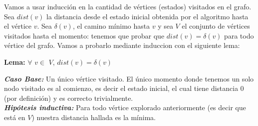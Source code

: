 Vamos a usar inducción en la cantidad de vértices (estados) visitados en el grafo.
Sea $dist(v)$ la distancia desde el estado inicial obtenida por el algoritmo hasta el vértice $v$. Sea $\delta(v)$, el camino mínimo hasta $v$ y sea $V$ el conjunto de vértices visitados hasta el momento: tenemos que probar que $dist(v) = \delta(v)$ para todo vértice del grafo. Vamos a probarlo mediante induccion con el siguiente lema:
\\


\begin{center}
\textbf{Lema: } $\forall$ $v \in$ $V$, $dist(v) = \delta(v)$
\end{center}

\emph{\textbf{Caso Base: }}  Un único vértice visitado. El único momento donde tenemos un solo nodo visitado es al comienzo, es decir
el estado inicial, el cual tiene distancia 0 (por definición) y es correcto trivialmente.
\\

\emph{\textbf{Hipótesis inductiva: }} Para todo vértice explorado anteriormente (es decir que está en $V$) nuestra distancia hallada es la mínima.
\\

